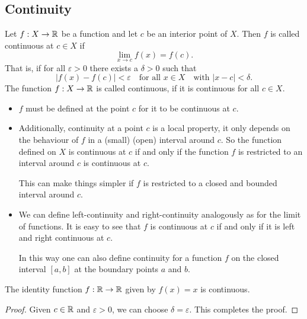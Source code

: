 \documentclass[10pt, a4paper]{article}
\begin{document}
\subsection{Continuity}

\begin{definition}
    Let $f : X \rightarrow \mathbb{R}$ be a function and let $c$ be an interior point of $X$.
    Then $f$ is called continuous at $c \in X$ if
    \[
    \lim_{x \rightarrow c}f(x) = f(c).
    \]
    That is,
    if for all $\varepsilon > 0$ there exists a $\delta > 0$ such that
    \[
    |f(x) - f(c)| < \varepsilon\quad\text{for all $x \in X$}\quad\text{with } |x - c| < \delta.
    \]
    The function $f : X \rightarrow \mathbb{R}$ is called continuous,
    if it is continuous for all $c \in X$.
\end{definition}

\begin{remark}\phantom{}
    \begin{itemize}
        \item 
        $f$ must be defined at the point $c$ for it to be continuous at $c$.

        \item
        Additionally,
        continuity at a point $c$ is a local property,
        it only depends on the behaviour of $f$ in a
        (small)
        (open)
        interval around $c$.
        So the function defined on $X$ is continuous at $c$ if and only if the function $f$ is restricted to an interval around $c$ is continuous at $c$.
        
        This can make things simpler if $f$ is restricted to a closed and bounded interval around $c$.
    
        \item 
        We can define left-continuity and right-continuity analogously as for the limit of functions.
        It is easy to see that $f$ is continuous at $c$ if and only if it is left and right continuous at $c$.

        In this way one can also define continuity for a function $f$ on the closed interval $[a, b]$ at the boundary points $a$ and $b$.
    \end{itemize}
\end{remark}

\begin{example}
    The identity function $f : \mathbb{R} \rightarrow \mathbb{R}$ given by $f(x) = x$ is continuous.
    \begin{proof}
        Given $c \in \mathbb{R}$ and $\varepsilon > 0$,
        we can choose $\delta = \varepsilon$.
        This completes the proof.
    \end{proof}
\end{example}
\end{document}
